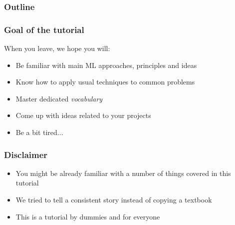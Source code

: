 \documentclass[usenames,dvipsnames]{beamer}
\author[Stroppa and Chrupala]{Grzegorz Chrupa{\l}a and Nicolas Stroppa}
\institute[Saarland + Google] %
{
Google\\
Saarland University
}
\date[2010] %
{META Workshop}
\newcommand{\voc}[1]{\emph{\color{ForestGreen}#1}}
\begin{document}
\frame{\titlepage}

\begin{frame}
  \frametitle{Outline}
  \tableofcontents
\end{frame}

\begin{frame}\frametitle{Goal of the tutorial}
   When you leave, we hope you will:
 \begin{itemize}
     \item Be familiar with main ML approaches, principles and ideas
     \item Know how to apply usual techniques to common problems
     \item Master dedicated \voc{vocabulary}
     \item Come up with ideas related to your projects
     \item Be a bit tired...
  \end{itemize}
\end{frame}


\begin{frame}\frametitle{Disclaimer}
\begin{block}{}
\begin{itemize}
  \item You might be already familiar with a number of things covered in this
tutorial
  \item We tried to tell a consistent story instead of copying a textbook
 \item This is a tutorial by dummies and for everyone
\end{itemize}
\end{block}

\end{frame}
\end{document}
